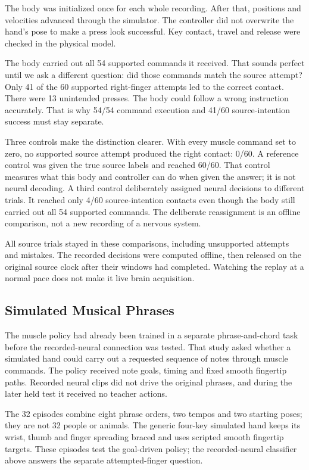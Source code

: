 The body was initialized once for each whole recording. After that, positions
and velocities advanced through the simulator. The controller did not overwrite
the hand's pose to make a press look successful. Key contact, travel and release
were checked in the physical model.

The body carried out all 54 supported commands it received. That sounds perfect
until we ask a different question: did those commands match the source attempt?
Only 41 of the 60 supported right-finger attempts led to the correct contact.
There were 13 unintended presses. The body could follow a wrong instruction
accurately. That is why 54/54 command execution and 41/60 source-intention
success must stay separate.

Three controls make the distinction clearer. With every muscle command set to
zero, no supported source attempt produced the right contact: 0/60. A reference
control was given the true source labels and reached 60/60. That control measures
what this body and controller can do when given the answer; it is not neural
decoding. A third control deliberately assigned neural decisions to different
trials. It reached only 4/60 source-intention contacts even though the body still
carried out all 54 supported commands. The deliberate reassignment is an offline
comparison, not a new recording of a nervous system.

All source trials stayed in these comparisons, including unsupported attempts
and mistakes. The recorded decisions were computed offline, then released on the
original source clock after their windows had completed. Watching the replay
at a normal pace does not make it live brain acquisition.

\subsection{Simulated Musical Phrases}

The muscle policy had already been trained in a separate phrase-and-chord task
before the recorded-neural connection was tested. That study asked whether a
simulated hand could carry out a requested sequence of notes through muscle
commands. The policy received note goals, timing and fixed smooth fingertip
paths. Recorded neural clips did not drive the original phrases, and during
the later held test it received no teacher actions.

The 32 episodes combine eight phrase orders, two tempos and two starting poses;
they are not 32 people or animals. The generic four-key simulated hand keeps
its wrist, thumb and finger spreading braced and uses scripted smooth fingertip
targets. These episodes test the goal-driven policy; the recorded-neural
classifier above answers the separate attempted-finger question.

